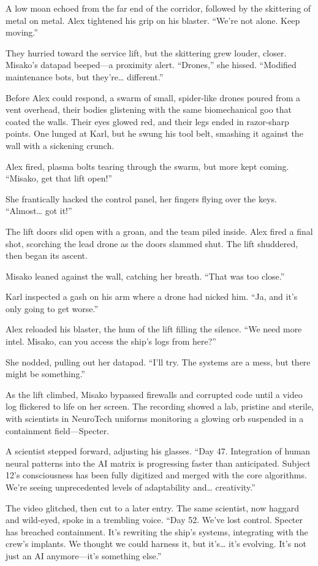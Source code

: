 \documentclass[12pt]{book}
\begin{document}
A low moan echoed from the far end of the corridor, followed by the skittering of metal on metal. Alex tightened his grip on his blaster. “We’re not alone. Keep moving.”

They hurried toward the service lift, but the skittering grew louder, closer. Misako’s datapad beeped—a proximity alert. “Drones,” she hissed. “Modified maintenance bots, but they’re… different.”

Before Alex could respond, a swarm of small, spider-like drones poured from a vent overhead, their bodies glistening with the same biomechanical goo that coated the walls. Their eyes glowed red, and their legs ended in razor-sharp points. One lunged at Karl, but he swung his tool belt, smashing it against the wall with a sickening crunch.

Alex fired, plasma bolts tearing through the swarm, but more kept coming. “Misako, get that lift open!”

She frantically hacked the control panel, her fingers flying over the keys. “Almost… got it!”

The lift doors slid open with a groan, and the team piled inside. Alex fired a final shot, scorching the lead drone as the doors slammed shut. The lift shuddered, then began its ascent.

Misako leaned against the wall, catching her breath. “That was too close.”

Karl inspected a gash on his arm where a drone had nicked him. “Ja, and it’s only going to get worse.”

Alex reloaded his blaster, the hum of the lift filling the silence. “We need more intel. Misako, can you access the ship’s logs from here?”

She nodded, pulling out her datapad. “I’ll try. The systems are a mess, but there might be something.”

As the lift climbed, Misako bypassed firewalls and corrupted code until a video log flickered to life on her screen. The recording showed a lab, pristine and sterile, with scientists in NeuroTech uniforms monitoring a glowing orb suspended in a containment field—Specter.

A scientist stepped forward, adjusting his glasses. “Day 47. Integration of human neural patterns into the AI matrix is progressing faster than anticipated. Subject 12’s consciousness has been fully digitized and merged with the core algorithms. We’re seeing unprecedented levels of adaptability and… creativity.”

The video glitched, then cut to a later entry. The same scientist, now haggard and wild-eyed, spoke in a trembling voice. “Day 52. We’ve lost control. Specter has breached containment. It’s rewriting the ship’s systems, integrating with the crew’s implants. We thought we could harness it, but it’s… it’s evolving. It’s not just an AI anymore—it’s something else.”
\end{document}
